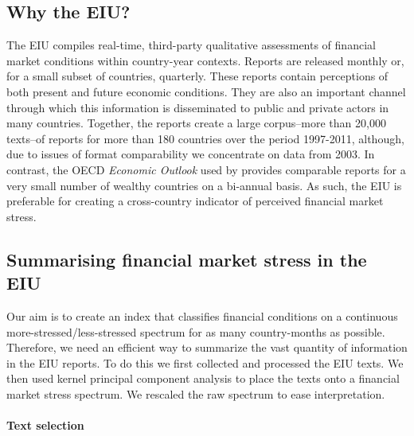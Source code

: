 \documentclass[]{article}
\begin{document}
\subsection{Why the EIU?}\label{why-the-eiu}

The EIU compiles real-time, third-party qualitative assessments of financial market conditions within country-year contexts. Reports are released monthly or, for a small subset of countries, quarterly. These reports contain perceptions of both present and future economic conditions. They are also an important channel through which this information is disseminated to public and private actors in many countries. Together, the reports create a large corpus--more than 20,000 texts--of reports for more than 180 countries over the period 1997-2011, although, due to issues of format comparability we concentrate on data from 2003. In contrast, the OECD \emph{Economic Outlook} used by \cite{Romer2015} provides comparable reports for a very small number of wealthy countries on a bi-annual basis. As such, the EIU is preferable for creating a cross-country indicator of perceived financial market stress.

\subsection{Summarising financial market stress in the
EIU}\label{summarizing-financial-market-stress-in-the-eiu}

Our aim is to create an index that classifies financial conditions on a continuous more-stressed/less-stressed spectrum for as many country-months as possible. Therefore, we need an efficient way to summarize the vast quantity of information in the EIU reports. To do this we first collected and processed the EIU texts. We then used kernel principal component analysis to place the texts onto a financial market stress spectrum. We rescaled the raw spectrum to ease interpretation.

\paragraph{Text selection}\label{text-selection}
\end{document}
